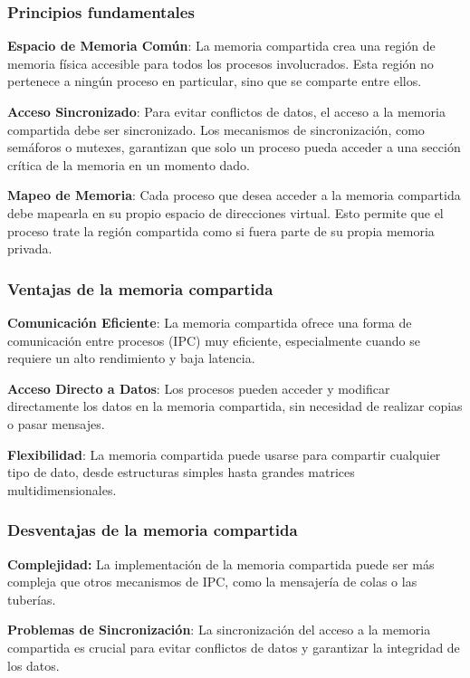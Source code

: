 \subsubsection{Principios fundamentales}

\textbf{Espacio de Memoria Común}: La memoria compartida crea una región de memoria física accesible para todos los procesos involucrados. Esta región no pertenece a ningún proceso en particular, sino que se comparte entre ellos.

\textbf{Acceso Sincronizado}: Para evitar conflictos de datos, el acceso a la memoria compartida debe ser sincronizado. Los mecanismos de sincronización, como semáforos o mutexes, garantizan que solo un proceso pueda acceder a una sección crítica de la memoria en un momento dado.

\textbf{Mapeo de Memoria}: Cada proceso que desea acceder a la memoria compartida debe mapearla en su propio espacio de direcciones virtual. Esto permite que el proceso trate la región compartida como si fuera parte de su propia memoria privada.

\subsubsection{Ventajas de la memoria compartida}

\textbf{Comunicación Eficiente}: La memoria compartida ofrece una forma de comunicación entre procesos (IPC) muy eficiente, especialmente cuando se requiere un alto rendimiento y baja latencia.

\textbf{Acceso Directo a Datos}: Los procesos pueden acceder y modificar directamente los datos en la memoria compartida, sin necesidad de realizar copias o pasar mensajes.

\textbf{Flexibilidad}: La memoria compartida puede usarse para compartir cualquier tipo de dato, desde estructuras simples hasta grandes matrices multidimensionales.

\subsubsection{Desventajas de la memoria compartida}

\textbf{Complejidad:} La implementación de la memoria compartida puede ser más compleja que otros mecanismos de IPC, como la mensajería de colas o las tuberías.

\textbf{Problemas de Sincronización}: La sincronización del acceso a la memoria compartida es crucial para evitar conflictos de datos y garantizar la integridad de los datos.

